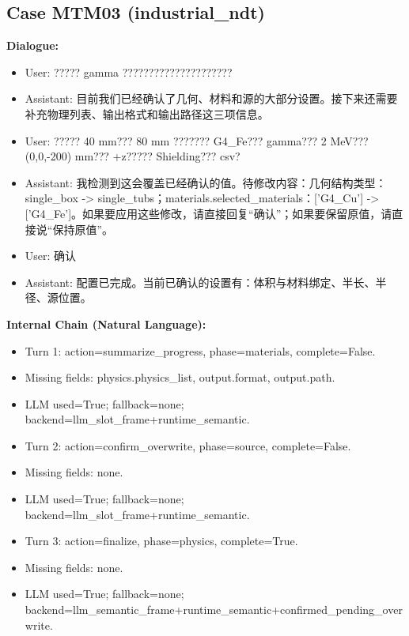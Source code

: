 \documentclass[11pt]{ctexart}
\begin{document}
\subsection{Case MTM03 (industrial\_ndt)}
\textbf{Dialogue:}
\begin{itemize}
\item User: ????? gamma ?????????????????????
\item Assistant: 目前我们已经确认了几何、材料和源的大部分设置。接下来还需要补充物理列表、输出格式和输出路径这三项信息。
\item User: ????? 40 mm??? 80 mm ??????? G4\_Fe??? gamma??? 2 MeV??? (0,0,-200) mm??? +z????? Shielding??? csv?
\item Assistant: 我检测到这会覆盖已经确认的值。待修改内容：几何结构类型：single\_box -> single\_tubs；materials.selected\_materials：['G4\_Cu'] -> ['G4\_Fe']。如果要应用这些修改，请直接回复“确认”；如果要保留原值，请直接说“保持原值”。
\item User: 确认
\item Assistant: 配置已完成。当前已确认的设置有：体积与材料绑定、半长、半径、源位置。
\end{itemize}
\textbf{Internal Chain (Natural Language):}
\begin{itemize}
\item Turn 1: action=summarize\_progress, phase=materials, complete=False.
\item Missing fields: physics.physics\_list, output.format, output.path.
\item LLM used=True; fallback=none; backend=llm\_slot\_frame+runtime\_semantic.
\item Turn 2: action=confirm\_overwrite, phase=source, complete=False.
\item Missing fields: none.
\item LLM used=True; fallback=none; backend=llm\_slot\_frame+runtime\_semantic.
\item Turn 3: action=finalize, phase=physics, complete=True.
\item Missing fields: none.
\item LLM used=True; fallback=none; backend=llm\_semantic\_frame+runtime\_semantic+confirmed\_pending\_overwrite.
\end{itemize}
\end{document}
